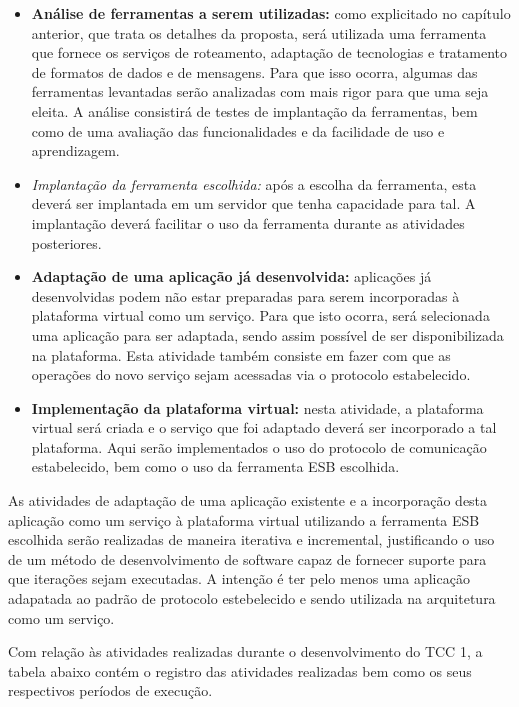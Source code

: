 \begin{itemize}
\item \textbf{Análise de ferramentas a serem utilizadas:} como explicitado no capítulo anterior, que trata os detalhes da proposta, será utilizada uma ferramenta que fornece os serviços de roteamento, adaptação de tecnologias e tratamento de formatos de dados e de mensagens. Para que isso ocorra, algumas das ferramentas levantadas serão analizadas com mais rigor para que uma seja eleita. A análise consistirá de testes de implantação da ferramentas, bem como de uma avaliação das funcionalidades e da facilidade de uso e aprendizagem.
\item \textit{Implantação da ferramenta escolhida:} após a escolha da ferramenta, esta deverá ser implantada em um servidor que tenha capacidade para tal. A implantação deverá facilitar o uso da ferramenta durante as atividades posteriores.
\item \textbf{Adaptação de uma aplicação já desenvolvida:} aplicações já desenvolvidas podem não estar preparadas para serem incorporadas à plataforma virtual como um serviço. Para que isto ocorra, será selecionada uma aplicação para ser adaptada, sendo assim possível de ser disponibilizada na plataforma. Esta atividade também consiste em fazer com que as operações do novo serviço sejam acessadas via o protocolo estabelecido.
\item \textbf{Implementação da plataforma virtual:} nesta atividade, a plataforma virtual será criada e o serviço que foi adaptado deverá ser incorporado a tal plataforma. Aqui serão implementados o uso do protocolo de comunicação estabelecido, bem como o uso da ferramenta ESB escolhida.
\end{itemize}

As atividades de adaptação de uma aplicação existente e a incorporação desta aplicação como um serviço à plataforma virtual utilizando a ferramenta ESB escolhida serão realizadas de maneira iterativa e incremental, justificando o uso de um método de desenvolvimento de software capaz de fornecer suporte para que iterações sejam executadas. A intenção é ter pelo menos uma aplicação adapatada ao padrão de protocolo estebelecido e sendo utilizada na arquitetura como um serviço.

Com relação às atividades realizadas durante o desenvolvimento do TCC 1, a tabela abaixo contém o registro das atividades realizadas bem como os seus respectivos períodos de execução.


